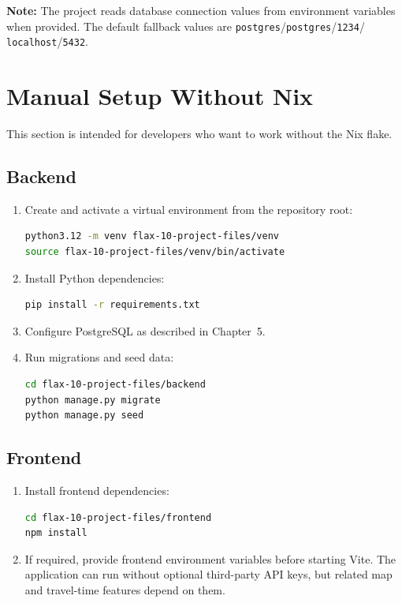 \documentclass[a4paper, 12pt]{report}
\begin{document}
\textbf{Note:} The project reads database connection values from
environment variables when provided. The default fallback values are
\texttt{postgres}/\texttt{postgres}/\texttt{1234}/
\texttt{localhost}/\texttt{5432}.

\chapter{Manual Setup Without Nix}

This section is intended for developers who want to work without the
Nix flake.

\section{Backend}

\begin{enumerate}
    \item Create and activate a virtual environment from the repository
          root:
\begin{lstlisting}[language=bash]
python3.12 -m venv flax-10-project-files/venv
source flax-10-project-files/venv/bin/activate
\end{lstlisting}

    \item Install Python dependencies:
\begin{lstlisting}[language=bash]
pip install -r requirements.txt
\end{lstlisting}

    \item Configure PostgreSQL as described in Chapter~5.

    \item Run migrations and seed data:
\begin{lstlisting}[language=bash]
cd flax-10-project-files/backend
python manage.py migrate
python manage.py seed
\end{lstlisting}
\end{enumerate}

\section{Frontend}

\begin{enumerate}
    \item Install frontend dependencies:
\begin{lstlisting}[language=bash]
cd flax-10-project-files/frontend
npm install
\end{lstlisting}

    \item If required, provide frontend environment variables before
          starting Vite. The application can run without optional
          third-party API keys, but related map and travel-time
          features depend on them.
\end{enumerate}
\end{document}
